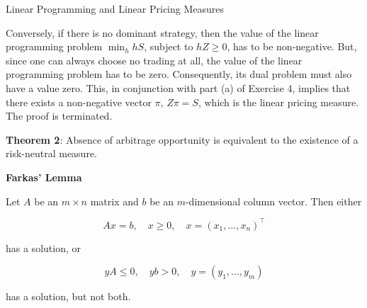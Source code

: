 \documentclass{beamer}
\begin{document}
\begin{frame}{Linear Programming and Linear Pricing Measures}

    {\footnotesize \footnotesize
    \par Conversely, if there is no dominant strategy, 
    then the value of the linear programming problem $\min_h hS$, 
    subject to $hZ \geq 0$, has to be non-negative. But, since one can 
    always choose no trading at all, the value of the linear programming 
    problem has to be zero. Consequently, its dual problem must also have a value 
    zero. This, in conjunction with part (a) of Exercise 4, implies that 
    there exists a non-negative vector $\pi$, $Z\pi = S$,
     which is the linear pricing measure. The proof is terminated.
     \vspace{1em}
    \par  \pause \textbf{Theorem 2}: Absence of arbitrage opportunity is equivalent 
    to the existence of a risk-neutral measure.
    \vspace{1em}
    \par  \pause \textbf{Farkas' Lemma}
    \par Let $A$ be an $m \times n$ matrix and $b$ be an $m$-dimensional column vector. Then either

    \[
    Ax = b, \quad x \geq 0, \quad x = (x_1, \ldots, x_n)^\top
    \]

    has a solution, or

    \[
    yA \leq 0, \quad yb > 0, \quad y = (y_1, \ldots, y_m)
    \]

    has a solution, but not both.

    }
\end{frame}
\end{document}
